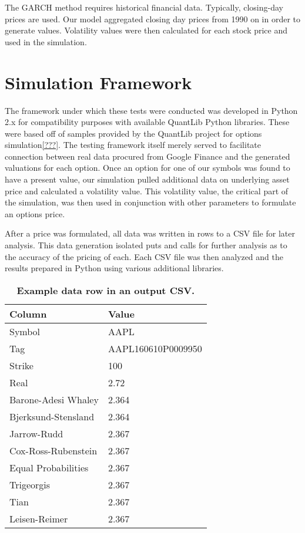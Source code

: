 The GARCH method requires historical financial data. Typically, closing-day prices are used. Our model aggregated closing day prices from 1990 on in order to generate values. Volatility values were then calculated for each stock price and used in the simulation.

\section{Simulation Framework}

The framework under which these tests were conducted was developed in Python 2.x for compatibility purposes with available QuantLib Python libraries. These were based off of samples provided by the QuantLib project for options simulation\ref{???}. The testing framework itself merely served to facilitate connection between real data procured from Google Finance and the generated valuations for each option. Once an option for one of our symbols was found to have a present value, our simulation pulled additional data on underlying asset price and calculated a volatility value. This volatility value, the critical part of the simulation, was then used in conjunction with other parameters to formulate an options price. 

After a price was formulated, all data was written in rows to a CSV file for later analysis. This data generation isolated puts and calls for further analysis as to the accuracy of the pricing of each. Each CSV file was then analyzed and the results prepared in Python using various additional libraries.

\begin{table}[h!]
\centering
\begin{tabu} to .8\textwidth { | X[c] | X[c] |  }
 \hline
 Column & Value \\
 \hline
 Symbol & AAPL \\
 Tag & AAPL160610P0009950  \\
Strike & 100 \\
Real & 2.72 \\
Barone-Adesi Whaley & 2.364 \\
Bjerksund-Stensland & 2.364 \\
Jarrow-Rudd & 2.367 \\
Cox-Ross-Rubenstein & 2.367 \\
Equal Probabilities & 2.367 \\
Trigeorgis & 2.367 \\
Tian & 2.367 \\
Leisen-Reimer & 2.367 \\
\hline
\end{tabu}
\caption {\textbf{Example data row in an output CSV.}}
\end{table}

